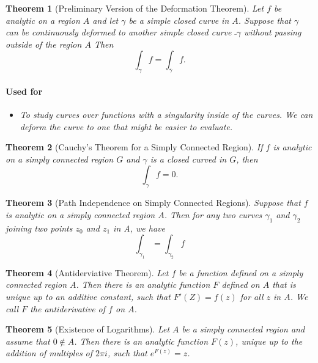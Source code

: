 \documentclass[a4paper]{article}
\newtheorem{theorem}{Theorem}
\begin{document}
\begin{theorem}[Preliminary Version of the Deformation Theorem]
  Let \(f\) be analytic on a region \(A\) and let \(\gamma\) be a simple closed curve in \(A\). 
  Suppose that \(\gamma\) can be continuously deformed to another simple closed curve \(\bar{}\gamma\) without passing outside of the region \(A\) Then
  \[
    \int_\gamma f = \int_{\bar{\gamma}} f.
  \]
  \paragraph{Used for}
    \begin{itemize}
      \item To study curves over functions with a singularity inside of the curves.
       We can deform the curve to one that might be easier to evaluate. 
    \end{itemize}
\end{theorem}



\begin{theorem}[Cauchy's Theorem for a Simply Connected Region]
  If \(f\) is analytic on a simply connected region \(G\) and \(\gamma\) is a closed curved in \(G\), then 
  \[
    \int_\gamma f = 0.
    \]
\end{theorem}

\begin{theorem}[Path Independence on Simply Connected Regions]
  Suppose that \(f\) is analytic on a simply connected region \(A\). 
  Then for any two curves \(\gamma_1\) and \(\gamma_2\) joining two points \(z_0\) and \(z_1\) in A, we have
  \[ \int_{\gamma_1} = \int_{\gamma_2} f\]
\end{theorem}

\begin{theorem}[Antiderviative Theorem]
  Let \(f\) be a function defined on a simply connected region \(A\). 
  Then there is an analytic function \(F\) defined on \(A\) that is unique up to an additive constant, such that \(F'(Z)  = f(z)\) for all \(z\) in \(A\). 
  We call \(F\) the antiderivative of \(f\) on \(A\). 
\end{theorem}


\begin{theorem}[Existence of Logarithms]
  Let \(A\) be a simply connected region and assume that \(0 \not \in A\).
  Then there is an analytic function \(F(z)\), unique up to the addition of multiples of \(2 \pi i\), such that \(e^{F(z)} = z\).
\end{theorem}
\end{document}
